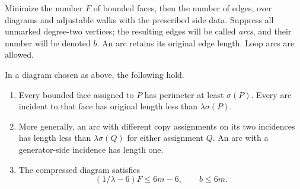 Minimize the number \(F\) of bounded faces, then the number of edges,
over diagrams and adjustable walks with the prescribed side data. Suppress
all unmarked degree-two vertices; the resulting edges will be called
\emph{arcs}, and their number will be denoted \(b\). An arc retains its
original edge length. Loop arcs are allowed.

\begin{lemma}\label{lem:diagram-count}
In a diagram chosen as above, the following hold.
\begin{enumerate}[label=\textup{(\alph*)}]
\item Every bounded face assigned to \(P\) has perimeter at least
\(\sigma(P)\). Every arc incident to that face has original length less
than \(\lambda\sigma(P)\).
\item More generally, an arc with different copy assignments on its two
incidences has length less than \(\lambda\sigma(Q)\) for either
assignment \(Q\). An arc with a generator-side incidence has length one.
\item The compressed diagram satisfies
\begin{equation}\label{eq:diagram-count}
(1/\lambda-6)F\le6m-6,\qquad b\le6m.
\end{equation}
\end{enumerate}
\end{lemma}

